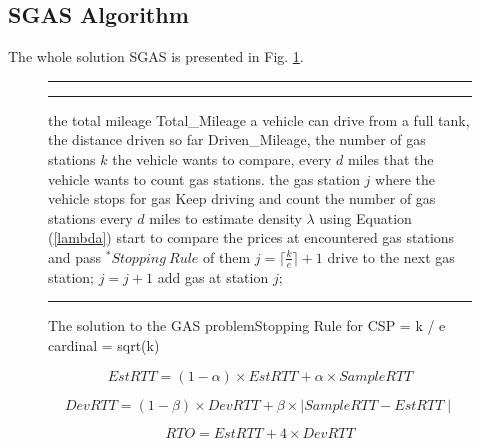 \documentclass[conference]{IEEEtran}
\theoremstyle{definition}
\begin{document}
\subsection{SGAS Algorithm}

The whole solution SGAS is presented in Fig. \ref{SGAS}.

\begin{figure}[!hbt]
\vspace{0.2cm}
\hrule \medskip {} \smallskip
\hrule
\smallskip
\begin{algorithmic}[1]
 the total mileage Total\_Mileage a vehicle can drive from a full tank, the distance driven so far Driven\_Mileage, the number of gas stations $k$ the vehicle wants to compare, every $d$ miles that the vehicle wants to count gas stations.
 the gas station $j$ where the vehicle stops for gas
\STATE Keep driving and count the number of gas stations every $d$ miles to estimate density $\lambda$ using Equation (\ref{lambda})
\ENDWHILE
{}
\STATE start to compare the prices at encountered gas stations and pass {$^*Stopping\ Rule$} of them
\ENDIF
\STATE $j = \lceil\frac{k}{e}\rceil + 1$
\STATE drive to the next gas station; $j = j+1$
\ENDWHILE
\STATE add gas at station $j$;
\end{algorithmic}
\hrule
\caption{The solution to the GAS problem\newline Stopping Rule for CSP = k / e \newline cardinal = sqrt(k)}
\label{SGAS}
\end{figure}

\begin{equation}
EstRTT = (1-\alpha)\times EstRTT + \alpha \times SampleRTT
\end{equation}

\begin{equation}
DevRTT = (1-\beta)\times DevRTT + \beta \times \mid SampleRTT - EstRTT \mid
\end{equation}

\begin{equation}
RTO = EstRTT + 4\times DevRTT
\end{equation}
\end{document}
